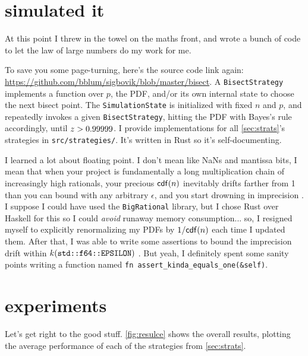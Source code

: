 \documentclass[11pt]{sigplanconf}
\begin{document}
\section{simulated it}

At this point I threw in the towel on the maths front,
and wrote a bunch of code to let the law of large numbers do my work for me.

To save you some page-turning, here's the source code link again:
\url{https://github.com/bblum/sigbovik/blob/master/bisect}.
A {\tt BisectStrategy}
implements a function over $p$, the PDF, and/or its own internal state
to choose the next bisect point.
The {\tt SimulationState} is initialized with fixed $n$ and $p$,
and repeatedly invokes a given {\tt BisectStrategy},
hitting the PDF with Bayes's rule accordingly,
until $z > 0.99999$.
I provide implementations for all \cref{sec:strats}'s strategies in {\tt src/strategies/}.
It's written in Rust so it's self-documenting.

I learned a lot about floating point.
I don't mean like NaNs and mantissa bits,
I mean that when your project is fundamentally a long multiplication chain of increasingly high rationals,
your precious $\mathsf{cdf}(n)$ inevitably drifts farther from 1 than you can bound with any arbitrary $\epsilon$, and you start drowning in imprecision \cite{drowningpoint}.
I suppose I could have used the {\tt BigRational} library,
but I chose Rust over Haskell for this so I could {\it avoid} runaway memory consumption...
so, I resigned myself to explicitly renormalizing my PDFs by $1/\mathsf{cdf}(n)$ each time I updated them.
After that, I was able to write some assertions
to bound the imprecision drift within $k(\text{\tt std::f64::EPSILON})$ \cite{epsilon}.
But yeah, I definitely spent some sanity points writing a function named {\tt fn assert\_kinda\_equals\_one(\&self)}.



\section{experiments}

Let's get right to the good stuff.
\cref{fig:resulce} shows the overall results,
plotting the average performance of each of the strategies from \cref{sec:strats}.
\end{document}
